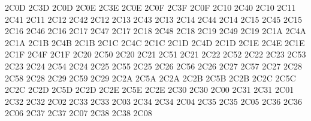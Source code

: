 \setcclcucx 2C0D 2C3D 2C0D %
\setcclcucx 2C0E 2C3E 2C0E %
\setcclcucx 2C0F 2C3F 2C0F %
\setcclcucx 2C10 2C40 2C10 %
\setcclcucx 2C11 2C41 2C11 %
\setcclcucx 2C12 2C42 2C12 %
\setcclcucx 2C13 2C43 2C13 %
\setcclcucx 2C14 2C44 2C14 %
\setcclcucx 2C15 2C45 2C15 %
\setcclcucx 2C16 2C46 2C16 %
\setcclcucx 2C17 2C47 2C17 %
\setcclcucx 2C18 2C48 2C18 %
\setcclcucx 2C19 2C49 2C19 %
\setcclcucx 2C1A 2C4A 2C1A %
\setcclcucx 2C1B 2C4B 2C1B %
\setcclcucx 2C1C 2C4C 2C1C %
\setcclcucx 2C1D 2C4D 2C1D %
\setcclcucx 2C1E 2C4E 2C1E %
\setcclcucx 2C1F 2C4F 2C1F %
\setcclcucx 2C20 2C50 2C20 %
\setcclcucx 2C21 2C51 2C21 %
\setcclcucx 2C22 2C52 2C22 %
\setcclcucx 2C23 2C53 2C23 %
\setcclcucx 2C24 2C54 2C24 %
\setcclcucx 2C25 2C55 2C25 %
\setcclcucx 2C26 2C56 2C26 %
\setcclcucx 2C27 2C57 2C27 %
\setcclcucx 2C28 2C58 2C28 %
\setcclcucx 2C29 2C59 2C29 %
\setcclcucx 2C2A 2C5A 2C2A %
\setcclcucx 2C2B 2C5B 2C2B %
\setcclcucx 2C2C 2C5C 2C2C %
\setcclcucx 2C2D 2C5D 2C2D %
\setcclcucx 2C2E 2C5E 2C2E %
\setcclcucx 2C30 2C30 2C00 %
\setcclcucx 2C31 2C31 2C01 %
\setcclcucx 2C32 2C32 2C02 %
\setcclcucx 2C33 2C33 2C03 %
\setcclcucx 2C34 2C34 2C04 %
\setcclcucx 2C35 2C35 2C05 %
\setcclcucx 2C36 2C36 2C06 %
\setcclcucx 2C37 2C37 2C07 %
\setcclcucx 2C38 2C38 2C08 %
